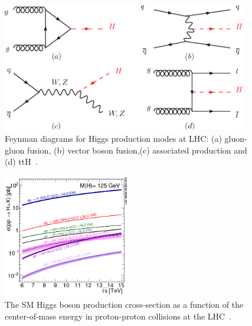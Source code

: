 \begin{figure}[hbtp]
 \begin{center}
   \includegraphics[width=0.95\textwidth]{plots_and_figures/chapter2/higgs_prod.png}
   \caption{ Feynman diagrams for Higgs production modes at LHC: (a) gluon-gluon fusion, (b) vector boson fusion,(c) associated production and (d) ttH~\cite{higg_prod}.}
   \label{fig:higs_feyn}
 \end{center}
\end{figure}


\begin{figure}[hbtp]
 \begin{center}
   \includegraphics[width=0.5\textwidth]{plots_and_figures/chapter2/higgs_xs.png}
   \caption{The SM Higgs boson production cross-section as a function of the center-of-mass energy in proton-proton collisions at the LHC~\cite{higg_prod}.}
   \label{fig:higs_xs_som}
 \end{center}
\end{figure}
    
